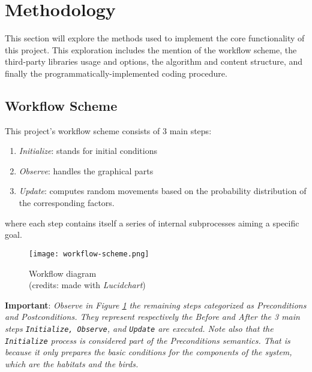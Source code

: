 \section{Methodology}
This section will explore the methods used to implement the core functionality of this project. This exploration includes the mention of the workflow scheme, the third-party libraries usage and options, the algorithm and content structure, and finally the programmatically-implemented coding procedure.

\subsection{Workflow Scheme}
This project's workflow scheme consists of 3 main steps:
\begin{enumerate}
    \item \textit{Initialize}: stands for initial conditions
    \item \textit{Observe}: handles the graphical parts
    \item \textit{Update}: computes random movements based on the probability distribution of the corresponding factors.
\end{enumerate}
where each step contains itself a series of internal subprocesses aiming a specific goal.

\begin{figure}[h!]
    \centering
    \texttt{[image: workflow-scheme.png]}
    \caption{Workflow diagram \\ (credits: made with \emph{Lucidchart})}
    \label{fig:workflow-scheme}
\end{figure}

\noindent
\textbf{Important}: \textit{Observe in Figure \ref{fig:workflow-scheme} the remaining steps categorized as \emph{Preconditions} and \emph{Postconditions}. They represent respectively the \emph{Before} and \emph{After} the 3 main steps \texttt{Initialize, Observe}, and \texttt{Update} are executed. Note also that the \texttt{Initialize} process is considered part of the Preconditions semantics. That is because it only prepares the basic conditions for the components of the system, which are the habitats and the birds.}

